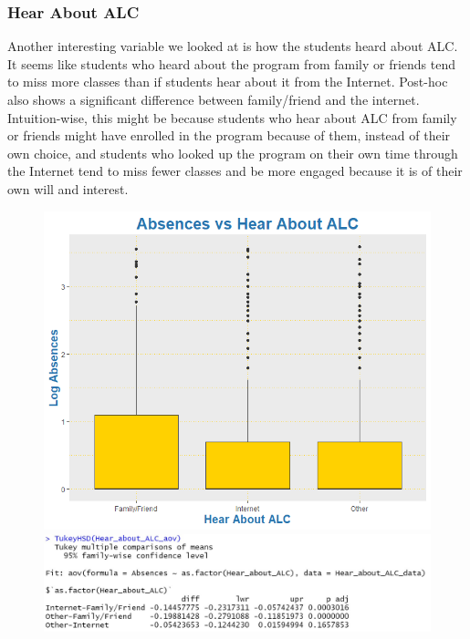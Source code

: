 \documentclass[12pt,letterpaper]{article}
\begin{document}
\subsubsection{Hear About ALC}

Another interesting variable we looked at is how the students heard about ALC. It seems like students who heard about the program from family or friends tend to miss more classes than if students hear about it from the Internet. Post-hoc also shows a significant difference between family/friend and the internet. Intuition-wise, this might be because students who hear about ALC from family or friends might have enrolled in the program because of them, instead of their own choice, and students who looked up the program on their own time through the Internet tend to miss fewer classes and be more engaged because it is of their own will and interest. 

\begin{figure}[!ht]
  \centering
  \begin{minipage}[b]{0.49\textwidth}
    \includegraphics[width=\textwidth]{Plots/6. Hear About ALC.png}
  \end{minipage}
  \hfill
  \begin{minipage}[b]{0.49\textwidth}
    \includegraphics[width=\textwidth]{Plots/6. Hear About ALC Tukey.jpg}
  \end{minipage}
\end{figure}
\end{document}
